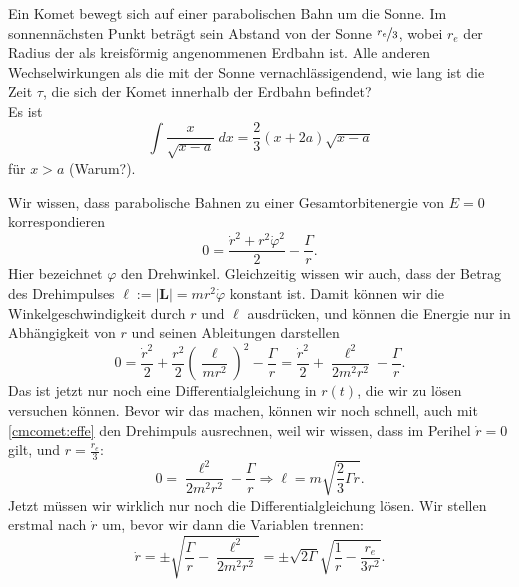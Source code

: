 \begin{Exercise}[difficulty = 3, title = Komet, origin = {Auswahlwettbewerb IPhO 2007, 3. Runde}, label = cmcomet]
	Ein Komet bewegt sich auf einer parabolischen Bahn um die Sonne. Im sonnennächsten Punkt beträgt sein Abstand von der Sonne $\nicefrac{r_e}{3}$, wobei $r_e$ der Radius der als kreisförmig angenommenen Erdbahn ist. Alle anderen Wechselwirkungen als die mit der Sonne vernachlässigendend, wie lang ist die Zeit $\tau$, die sich der Komet innerhalb der Erdbahn befindet?\\
	\small{Es ist \begin{equation}
		\label{cmcomet:int}
		\int \frac{x}{\sqrt{x-a}}~dx = \frac{2}{3}\left(x+2a\right)\sqrt{x-a}\end{equation} für $x>a$ (Warum?).}
\end{Exercise}
\begin{Answer}[ref = cmcomet]
	Wir wissen, dass parabolische Bahnen zu einer Gesamtorbitenergie von $E = 0$ korrespondieren
	\begin{equation}\label{cmcomet:edef}
		  0 = \frac{\dot{r}^2 + r^2\dot{\varphi}^2}{2}- \frac{\Gamma}{r}.
	\end{equation}
	Hier bezeichnet $\varphi$ den Drehwinkel. Gleichzeitig wissen wir auch, dass der Betrag des Drehimpulses $\ell := \left|\mathbf{L}\right| = m r^2\dot{\varphi}$ konstant ist. Damit können wir die Winkelgeschwindigkeit durch $r$ und $\ell$ ausdrücken, und können die Energie nur in Abhängigkeit von $r$ und seinen Ableitungen darstellen
	\begin{equation}\label{cmcomet:effe}
		0 =\frac{\dot{r}^2}{2} + \frac{r^2}{2} \left(\frac{\ell}{mr^2}\right)^2 - \frac{\Gamma}{r} = \frac{\dot{r}^2}{2} + \frac{\ell^2}{2m^2r^2} - \frac{\Gamma}{r}.
	\end{equation}
	Das ist jetzt nur noch eine Differentialgleichung in $r\left(t\right)$, die wir zu lösen versuchen können. Bevor wir das machen, können wir noch schnell, auch mit \eqref{cmcomet:effe} den Drehimpuls ausrechnen, weil wir wissen, dass im Perihel $\dot{r} = 0$ gilt, und $r = \frac{r_e}{3}$:
	\begin{equation}\label{cmcomet:ldef}
		0 = \frac{\ell^2}{2m^2r^2} - \frac{\Gamma}{r} \Rightarrow \ell = m \sqrt{\frac{2}{3}\Gamma r}.
	\end{equation}
	Jetzt müssen wir wirklich nur noch die Differentialgleichung lösen. Wir stellen erstmal nach $\dot r$ um, bevor wir dann die Variablen trennen:
	\begin{equation*}
		\dot{r} = \pm \sqrt{\frac{\Gamma}{r} - \frac{\ell^2}{2m^2r^2}} =\pm \sqrt{2\Gamma}\sqrt{\frac{1}{r} -  \frac{r_e}{3r^2}}.

\end{equation*}
\end{Answer}
